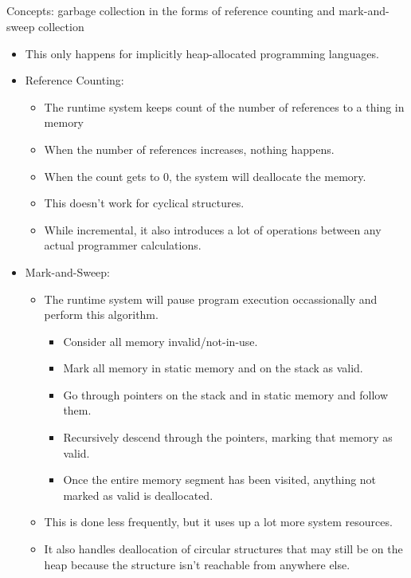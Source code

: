 \subsection{}
Concepts: garbage collection in the forms of reference counting and mark-and-sweep collection

\begin{itemize}
\item This only happens for implicitly heap-allocated programming languages.
\item Reference Counting:
  \begin{itemize}[noitemsep]
  \item The runtime system keeps count of the number of references to a thing in memory
  \item When the number of references increases, nothing happens.
  \item When the count gets to 0, the system will deallocate the memory.
  \item This doesn't work for cyclical structures.
  \item While incremental, it also introduces a lot of operations between any actual programmer calculations.
  \end{itemize}

\item Mark-and-Sweep:
  \begin{itemize}[noitemsep]
  \item The runtime system will pause program execution occassionally and perform this algorithm.
    \begin{itemize}[noitemsep]
    \item Consider all memory invalid/not-in-use.
    \item Mark all memory in static memory and on the stack as valid.
    \item Go through pointers on the stack and in static memory and follow them.
    \item Recursively descend through the pointers, marking that memory as valid.
    \item Once the entire memory segment has been visited, anything not marked as valid is deallocated.
    \end{itemize}
  \item This is done less frequently, but it uses up a lot more system resources.
  \item It also handles deallocation of circular structures that may still be on the heap because the structure isn't reachable from anywhere else.
  \end{itemize}
\end{itemize}


